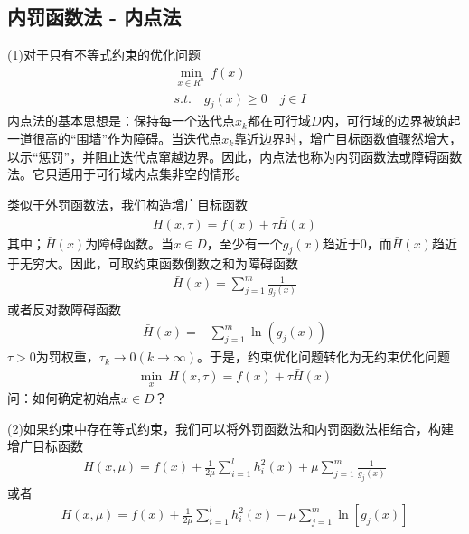     \subsection{内罚函数法 - 内点法}
        \par
        (1)对于只有不等式约束的优化问题
        \begin{align*}
        &\mathop {\min}\limits_{x\in R^n}\  f(x)\\
        &s.t.\quad g_j(x) \geqslant 0\quad j \in I
        \end{align*}
        内点法的基本思想是：保持每一个迭代点$x_k$都在可行域$D$内，可行域的边界被筑起一道很高的“围墙”作为障碍。当迭代点$x_k$靠近边界时，增广目标函数值骤然增大，以示“惩罚”，并阻止迭代点窜越边界。因此，内点法也称为内罚函数法或障碍函数法。它只适用于可行域内点集非空的情形。
        \par
        类似于外罚函数法，我们构造增广目标函数
        \begin{align*}
        H(x,\tau)=f(x)+\tau \bar{H}(x)
        \end{align*}
        其中；$\bar{H}(x)$为障碍函数。当$x \in D$，至少有一个$g_j(x)$趋近于0，而$\bar{H}(x)$趋近于无穷大。因此，可取约束函数倒数之和为障碍函数
        \begin{align*}
        \bar{H}(x)=\mathop {\sum}\limits_{j=1}^m \frac{1}{g_j(x)}
        \end{align*}
        或者反对数障碍函数
        \begin{align*}
        \bar{H}(x)=-\mathop {\sum}\limits_{j=1}^m \ln(g_j(x))
        \end{align*}
        $\tau>0$为罚权重，$\tau_k \to 0(k \to \infty)$。于是，约束优化问题转化为无约束优化问题
        \begin{align*}
        \mathop {\min}\limits_{x}\ H(x,\tau)=f(x)+\tau \bar{H}(x)
        \end{align*}
        问：如何确定初始点$x \in D$？
        \par
        (2)如果约束中存在等式约束，我们可以将外罚函数法和内罚函数法相结合，构建增广目标函数
        \begin{align*}
        H(x,\mu)=f(x)+\frac{1}{2\mu}\mathop {\sum}\limits_{i=1}^l h_i^2(x)+\mu\mathop {\sum}\limits_{j=1}^m \frac{1}{g_j(x)}
        \end{align*}
        或者
        \begin{align*}
        H(x,\mu)=f(x)+\frac{1}{2\mu}\mathop {\sum}\limits_{i=1}^l h_i^2(x)-\mu\mathop {\sum}\limits_{j=1}^m \ln[{g_j(x)}]
        \end{align*}
